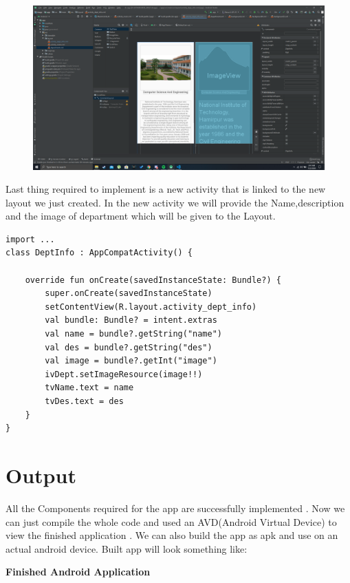 \documentclass[11pt,a4paper]{report}
\begin{document}
\begin{figure}[H]
	\centering
		\includegraphics[scale=0.2]{./img/new_act.png}
  \end{figure}

  \vspace{5pt}


  Last thing required to implement is a new activity that is linked to the new layout we just 
  created.
  In the new activity we will provide the Name,description and the image of department which 
  will be given to the Layout.

\vspace{10pt}
\begin{lstlisting}[caption=DeptInfo.kt]
import ...
class DeptInfo : AppCompatActivity() {

    override fun onCreate(savedInstanceState: Bundle?) {
        super.onCreate(savedInstanceState)
        setContentView(R.layout.activity_dept_info)
        val bundle: Bundle? = intent.extras
        val name = bundle?.getString("name")
        val des = bundle?.getString("des")
        val image = bundle?.getInt("image")
        ivDept.setImageResource(image!!)
        tvName.text = name
        tvDes.text = des
    }
}

\end{lstlisting}

\chapter{Output}

  All the Components required for the app are successfully implemented .
  Now we can just compile the whole code and used an AVD(Android Virtual Device)
  to view the finished application . We can also build the app as apk and use on an 
  actual android device. Built app will look something like:
  \vspace{15pt}
  \begin{center}
    \textbf{Finished Android Application}
  \end{center}
   
\end{document}
